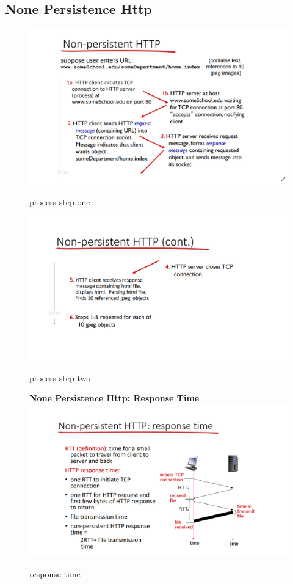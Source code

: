 \documentclass[fancy,11pt,titlestyle=display]{style/elegantbook}
\begin{document}
\subsection{None Persistence Http}
\begin{figure}[htp]
    \centering
    \includegraphics[width=\textwidth]{image/myfolder/np.png}
    \caption{process step one}
     \*
    \centering
    \includegraphics[width=\textwidth]{image/myfolder/np2.png}
    \caption{process step two}
\textbf{None Persistence Http: Response Time}
    \centering
    \includegraphics[width=\textwidth]{image/myfolder/np3.png}
    \caption{response time}
\end{figure}
\vfill
\clearpage
\end{document}
